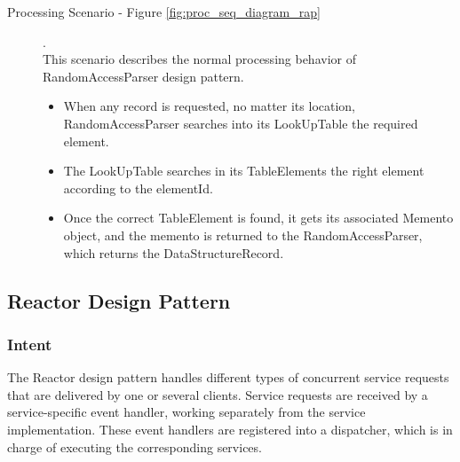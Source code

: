 
\begin{description}
	
	
	\item[Processing Scenario - Figure \ref{fig:proc_seq_diagram_rap} ].\\
	This scenario describes the normal processing behavior of RandomAccessParser design pattern.
	
	\begin{itemize}
		\item  When any record is requested, no matter its location, RandomAccessParser searches into its LookUpTable the required element.
		
		\item  The LookUpTable searches in its TableElements the right element according to the elementId.
		
		\item  Once the correct TableElement is found, it gets its associated Memento object, and the memento is returned to the RandomAccessParser, which returns the DataStructureRecord.
	\end{itemize}
	
\end{description}

\subsection{Reactor Design Pattern}

\subsubsection{Intent}
The Reactor design pattern handles different types of concurrent service requests that are delivered by one or several clients. Service requests are received by a service-specific event handler, working separately from the service implementation. These event handlers are registered into a dispatcher, which is in charge of executing the corresponding services.


